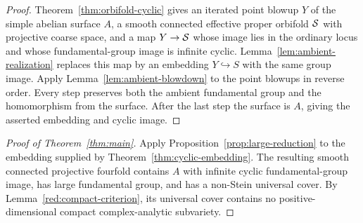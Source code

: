 \begin{proof}
Theorem~\ref{thm:orbifold-cyclic} gives an iterated point blowup $Y$ of
the simple abelian surface $A$, a smooth connected effective proper
orbifold $\mathcal S$ with projective coarse space, and a map $Y\to\mathcal S$
whose image lies in the ordinary locus and whose fundamental-group
image is infinite cyclic.  Lemma~\ref{lem:ambient-realization} replaces
this map by an embedding $Y\hookrightarrow S$ with the same group
image.  Apply Lemma~\ref{lem:ambient-blowdown} to the point blowups in
reverse order.  Every step preserves both the ambient fundamental
group and the homomorphism from the surface.  After the last step the
surface is $A$, giving the asserted embedding and cyclic image.
\end{proof}

\begin{samepage}
\begin{proof}[Proof of Theorem~\ref{thm:main}]
Apply Proposition~\ref{prop:large-reduction} to the embedding supplied
by Theorem~\ref{thm:cyclic-embedding}.  The resulting smooth connected
projective fourfold contains $A$ with infinite cyclic fundamental-group
image, has large fundamental group, and has a non-Stein universal cover.  By Lemma~\ref{red:compact-criterion}, its universal
cover contains no positive-dimensional compact complex-analytic
subvariety.
\end{proof}
\end{samepage}

